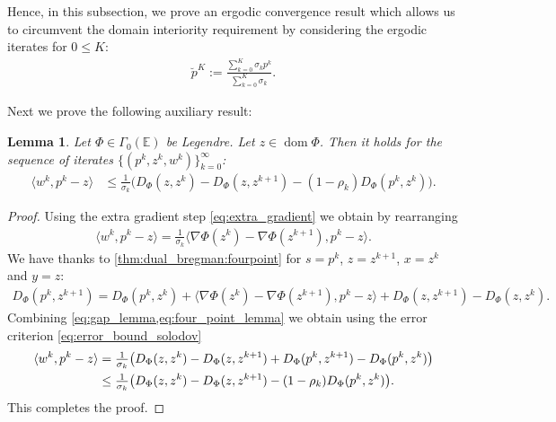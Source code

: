 \documentclass[11pt,onecolumn]{article}
\DeclareMathOperator{\dom}{dom}
\newtheorem{lemma}[lemma]{Lemma}
\theoremstyle{remark}
\begin{document}
Hence, in this subsection, we prove an ergodic convergence result which allows us to circumvent the domain interiority requirement by considering the ergodic iterates for $0 \leq K$:
\begin{align} \label{eq:ergodic_four_point}
    \breve p^K := \frac{\sum_{k=0}^{K} \sigma_k p^{k}}{\sum_{k=0}^{K} \sigma_k}.
\end{align}

Next we prove the following auxiliary result:
\begin{lemma} \label{thm:ergodic_four_point}
Let $\Phi \in \Gamma_0(\mathbb{E})$ be Legendre. Let $z \in \dom \Phi$. Then it holds for the sequence of iterates $\{(p^k,z^k, w^k)\}_{k=0}^\infty$:
\begin{align}
\langle w^k,  p^k - z\rangle &\leq \tfrac{1}{\sigma_k}\big(D_\Phi(z,z^k) -  D_\Phi(z,z^{k+1}) - (1-\rho_k) D_\Phi(p^k,z^{k})\big).
\end{align}
\end{lemma}
\begin{proof}
Using the extra gradient step \cref{eq:extra_gradient} we obtain by rearranging
\begin{align} \label{eq:gap_lemma}
  \langle w^k,  p^k - z\rangle =\tfrac{1}{\sigma_k}\langle \nabla \Phi(z^k) -\nabla \Phi(z^{k+1}), p^k - z \rangle.
\end{align}
We have thanks to \cref{thm:dual_bregman:fourpoint} for $s=p^k$, $z=z^{k+1}$, $x = z^k$ and $y=z$:
\begin{align} \label{eq:four_point_lemma}
D_\Phi(p^k,z^{k+1}) = D_\Phi(p^k,z^k) + \langle \nabla \Phi(z^k) - \nabla \Phi(z^{k+1}), p^k-z \rangle + D_\Phi(z,z^{k+1}) - D_\Phi(z,z^k).
\end{align}
Combining \cref{eq:gap_lemma,eq:four_point_lemma} we obtain using the error criterion \cref{eq:error_bound_solodov}
\begin{align}
    \langle w^k,  p^k - z\rangle &=\tfrac{1}{\sigma_k}\big(D_\Phi(z,z^k) -  D_\Phi(z,z^{k+1}) + D_\Phi(p^k,z^{k+1}) -D_\Phi(p^k,z^k)\big) \notag \\
   &\leq \tfrac{1}{\sigma_k}\big(D_\Phi(z,z^k) -  D_\Phi(z,z^{k+1}) - (1-\rho_k) D_\Phi(p^k,z^{k})\big).
\end{align}
This completes the proof.
\end{proof}
\end{document}
